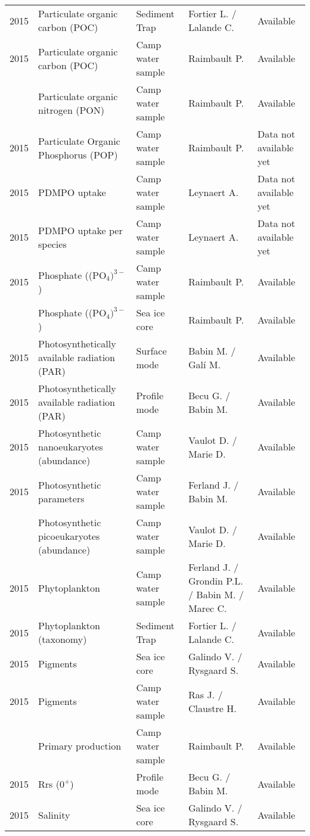 \documentclass[]{article}
\begin{document}
\begin{landscape}
\begin{longtable}[t]{rllll}
2015 & Particulate organic carbon (POC) & Sediment Trap & Fortier L. / Lalande C. & Available\\
2015 & Particulate organic carbon (POC) & Camp water sample & Raimbault P. & Available\\
\addlinespace
2015 & Particulate organic nitrogen (PON) & Camp water sample & Raimbault P. & Available\\
2015 & Particulate Organic Phosphorus (POP) & Camp water sample & Raimbault P. & Data not available yet\\
2015 & PDMPO uptake & Camp water sample & Leynaert A. & Data not available yet\\
2015 & PDMPO uptake per species & Camp water sample & Leynaert A. & Data not available yet\\
2015 & Phosphate ((PO$_4)^{3-}$) & Camp water sample & Raimbault P. & Available\\
\addlinespace
2015 & Phosphate ((PO$_4)^{3-}$) & Sea ice core & Raimbault P. & Available\\
2015 & Photosynthetically available radiation (PAR) & Surface mode & Babin M. / Galí M. & Available\\
2015 & Photosynthetically available radiation (PAR) & Profile mode & Becu G. / Babin M. & Available\\
2015 & Photosynthetic nanoeukaryotes (abundance) & Camp water sample & Vaulot D. / Marie D. & Available\\
2015 & Photosynthetic parameters & Camp water sample & Ferland J. / Babin M. & Available\\
\addlinespace
2015 & Photosynthetic picoeukaryotes (abundance) & Camp water sample & Vaulot D. / Marie D. & Available\\
2015 & Phytoplankton & Camp water sample & Ferland J. / Grondin P.L. / Babin M. / Marec C. & Available\\
2015 & Phytoplankton (taxonomy) & Sediment Trap & Fortier L. / Lalande C. & Available\\
2015 & Pigments & Sea ice core & Galindo V. / Rysgaard S. & Available\\
2015 & Pigments & Camp water sample & Ras J. / Claustre H. & Available\\
\addlinespace
2015 & Primary production & Camp water sample & Raimbault P. & Available\\
2015 & Rrs ($0^+$) & Profile mode & Becu G. / Babin M. & Available\\
2015 & Salinity & Sea ice core & Galindo V. / Rysgaard S. & Available\\

\end{longtable}
\end{landscape}
\end{document}
